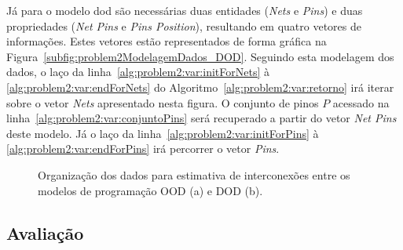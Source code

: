 Já para o modelo \ac{dod} são necessárias duas entidades (\textit{Nets} e \textit{Pins}) e duas propriedades (\textit{Net Pins} e \textit{Pins Position}), resultando em quatro vetores de informações. Estes vetores estão representados de forma gráfica na Figura~\ref{subfig:problem2ModelagemDados_DOD}.
Seguindo esta modelagem dos dados, o laço da linha~\ref{alg:problem2:var:initForNets} à \ref{alg:problem2:var:endForNets} do Algoritmo~\ref{alg:problem2:var:retorno} irá iterar sobre o vetor \textit{Nets} apresentado nesta figura. O conjunto de pinos $P$ acessado na linha~\ref{alg:problem2:var:conjuntoPins} será recuperado a partir do vetor \textit{Net Pins} deste modelo. Já o laço da linha~\ref{alg:problem2:var:initForPins} à \ref{alg:problem2:var:endForPins} irá percorrer o vetor \textit{Pins}.

\begin{figure}[ht]
    \centering
    \caption[Organização dos dados estudo de caso 2]{Organização dos dados para estimativa de interconexões entre os modelos de programação OOD (a) e DOD (b).}
    \label{fig:problem2ModelagemDados}
\end{figure}


\subsection{Avaliação}

